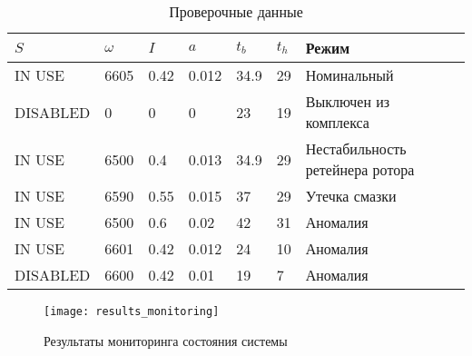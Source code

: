 \begin{table}
\caption{Проверочные данные}
\label{tab:spec:results:input}
\begin{tabular}{|C{80pt}|C{50pt}|C{50pt}|C{50pt}|C{50pt}|C{50pt}|C{100pt}|}
\hline
$S$ & $\omega$ & $I$ & $a$ & $t_b$ & $t_h$ & Режим \\
\hline
IN USE & 6605 & 0.42 & 0.012 & 34.9 & 29 & Номинальный \\
\hline
DISABLED & 0 & 0 & 0 & 23 & 19 & Выключен из комплекса \\
\hline
IN USE & 6500 & 0.4 & 0.013 & 34.9 & 29 & Нестабильность ретейнера ротора \\
\hline
IN USE & 6590 & 0.55 & 0.015 & 37 & 29 & Утечка смазки \\
\hline
IN USE & 6500 & 0.6 & 0.02 & 42 & 31 & Аномалия \\
\hline
IN USE & 6601 & 0.42 & 0.012 & 24 & 10 & Аномалия \\
\hline
DISABLED & 6600 & 0.42 & 0.01 & 19 & 7 & Аномалия \\
\hline
\end{tabular}
\end{table}

\begin{figure}
\caption{Результаты мониторинга состояния системы}
\label{fig:spec:results:monitoring}
\texttt{[image: results\_monitoring]}
\end{figure}